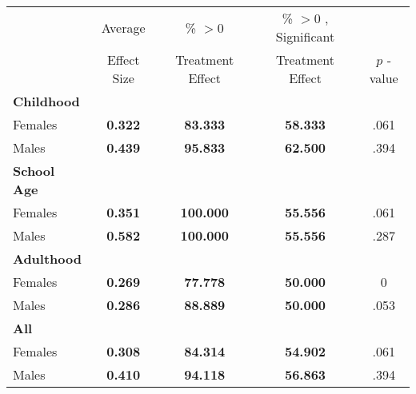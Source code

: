 \begin{tabular}{l c c c c}
\toprule
 & Average & \% $ >0 $ & \% $ >0 $ , Significant & \citet{Rosenbaum_2005_Distribution_JRSS} \\
 & Effect Size & Treatment Effect & Treatment Effect & $ p $ -value \\
\midrule
\textbf{Childhood} & & & & \\
\quad Females &  \textbf{    0.322} & \textbf{   83.333} & \textbf{   58.333} & .061 \\
\quad Males &  \textbf{    0.439} & \textbf{   95.833} & \textbf{   62.500} & .394 \\
\midrule
\textbf{School Age} & & & & \\
\quad Females &  \textbf{    0.351} & \textbf{  100.000} & \textbf{   55.556} & .061 \\
\quad Males &  \textbf{    0.582} & \textbf{  100.000} & \textbf{   55.556} & .287 \\
\midrule
\textbf{Adulthood} & & & & \\
\quad Females &  \textbf{    0.269} & \textbf{   77.778} & \textbf{   50.000} & 0 \\
\quad Males &  \textbf{    0.286} & \textbf{   88.889} & \textbf{   50.000} & .053 \\
\midrule
\textbf{All} & & & & \\
\quad Females &  \textbf{    0.308} & \textbf{   84.314} & \textbf{   54.902} & .061 \\
\quad Males &  \textbf{    0.410} & \textbf{   94.118} & \textbf{   56.863} & .394 \\
\bottomrule
\end{tabular}
